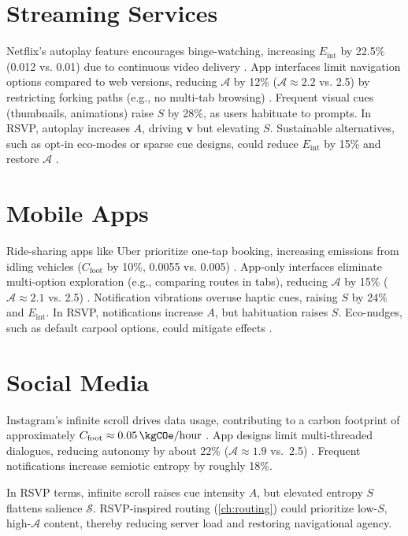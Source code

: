 \documentclass[openany]{book}
\newcommand{\vvec}{\mathbf{v}} %
\newcommand{\Sent}{S} %
\newcommand{\Eint}{E_{\mathrm{int}}} %
\newcommand{\Cfoot}{C_{\mathrm{foot}}} %
\newcommand{\Auton}{\mathcal{A}} %
\newcommand{\kWh}{\mathrm{kWh}}
\begin{document}
\section{Streaming Services}
\label{sec:cases-streaming}
Netflix’s autoplay feature encourages binge-watching, increasing \(\Eint\) by 22.5\% (\SI{0.012}{\kWh} vs. \SI{0.01}{\kWh}) due to continuous video delivery \citep{colak2024}. App interfaces limit navigation options compared to web versions, reducing \(\Auton\) by 12\% (\(\Auton \approx 2.2\) vs. 2.5) by restricting forking paths (e.g., no multi-tab browsing) \citep{doctorow2022}. Frequent visual cues (thumbnails, animations) raise \(\Sent\) by 28\%, as users habituate to prompts. In RSVP, autoplay increases \(A\), driving \(\vvec\) but elevating \(\Sent\). Sustainable alternatives, such as opt-in eco-modes or sparse cue designs, could reduce \(\Eint\) by 15\% and restore \(\Auton\) \citep{extentia2024}.

\section{Mobile Apps}
\label{sec:cases-apps}
Ride-sharing apps like Uber prioritize one-tap booking, increasing emissions from idling vehicles (\(\Cfoot\) by 10\%, \SI{0.0055}{\kgCOe} vs. \SI{0.005}{\kgCOe}) \citep{colak2024}. App-only interfaces eliminate multi-option exploration (e.g., comparing routes in tabs), reducing \(\Auton\) by 15\% (\(\Auton \approx 2.1\) vs. 2.5) \citep{doctorow2022}. Notification vibrations overuse haptic cues, raising \(\Sent\) by 24\% and \(\Eint\). In RSVP, notifications increase \(A\), but habituation raises \(\Sent\). Eco-nudges, such as default carpool options, could mitigate effects \citep{colak2024}.

\section{Social Media}
\label{sec:cases-social}

Instagram’s infinite scroll drives data usage, contributing to a carbon footprint 
of approximately \(\Cfoot \approx \SI{0.05}{\kgCOe}/\text{hour}\) \citep{designlab2024}. 
App designs limit multi-threaded dialogues, reducing autonomy by about 22\% 
(\(\Auton \approx 1.9\) vs.\ 2.5) \citep{doctorow2022}. 
Frequent notifications increase semiotic entropy by roughly 18\%. 

In RSVP terms, infinite scroll raises cue intensity \(A\), 
but elevated entropy \(S\) flattens salience \(\mathcal{S}\). 
RSVP-inspired routing (\cref{ch:routing}) could prioritize 
low-\(S\), high-\(\Auton\) content, thereby reducing server load 
and restoring navigational agency.
\end{document}
